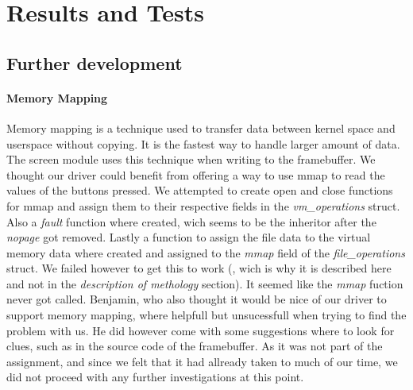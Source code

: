 \section{Results and Tests}

\subsection{Further development}
\paragraph{Memory Mapping}
Memory mapping is a technique used to transfer data between kernel space and userspace without copying. It is the fastest way to handle larger amount of data. The screen module uses this technique when writing to the framebuffer. We thought our driver could benefit from offering a way to use mmap to read the values of the buttons pressed. We attempted to create open and close functions for mmap and assign them to their respective fields in the \emph{vm\_operations} struct. Also a \emph{fault} function where created, wich seems to be the inheritor after the \emph{nopage} got removed. Lastly a function to assign the file data to the virtual memory data where created and assigned to the \emph{mmap} field of the \emph{file\_operations} struct. We failed however to get this to work (, wich is why it is described here and not in the \emph{description of methology} section). It seemed like the \emph{mmap} fuction never got called. Benjamin, who also thought it would be nice of our driver to support memory mapping, where helpfull but unsucessfull when trying to find the problem with us. He did however come with some suggestions where to look for clues, such as in the source code of the framebuffer. As it was not part of the assignment, and since we felt that it had allready taken to much of our time, we did not proceed with any further investigations at this point.
